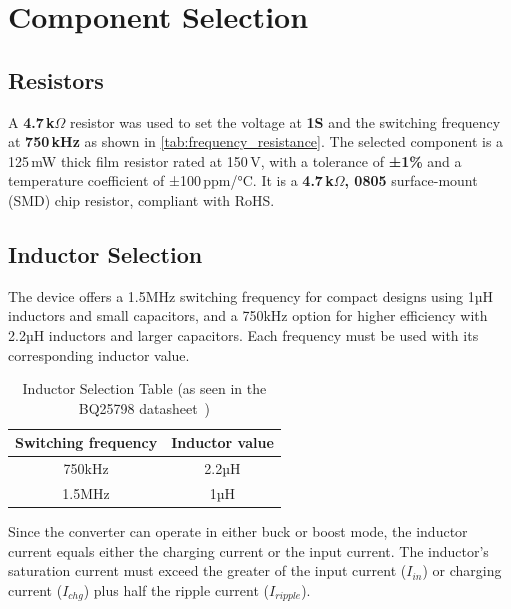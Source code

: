\documentclass[12pt]{article}
\begin{document}
\section{Component Selection}

\subsection{Resistors}
A \textbf{4.7\,k\(\Omega\)} resistor was used to set the voltage at \textbf{ 1S} and the switching frequency at \textbf{ 750\,kHz} as shown in \autoref{tab:frequency_resistance}.
The selected component is a 125\,mW thick film resistor rated at 150\,V, with a tolerance of \textbf{±1\%} and a temperature coefficient of ±100\,ppm/°C. It is a \textbf{4.7\,k\(\Omega\), 0805} surface-mount (SMD) chip resistor, compliant with RoHS.

\subsection{Inductor Selection}
The device offers a 1.5MHz switching frequency for compact designs using 1µH inductors and small capacitors, and a 750kHz option for higher efficiency with 2.2µH inductors and larger capacitors. Each frequency must be used with its corresponding inductor value. 

\begin{table}[H]
    \centering
    \begin{tabular}{|c|c|}
        \hline
        \rowcolor{headerbg}
        \textcolor{headerfg}{\textbf{Switching frequency}} &
        \textcolor{headerfg}{\textbf{Inductor value}} \\
        \hline
        750kHz & 2.2µH \\
        1.5MHz & 1µH \\
        \hline
    \end{tabular}
    \caption{Inductor Selection Table (as seen in the BQ25798 datasheet~\cite[p.~46]{TI_BQ25798})}
    \label{tab:Inductor-Selection}
\end{table}

Since the converter can operate in either buck or boost mode, the inductor current equals either the charging current or the input current. The inductor's saturation current must exceed the greater of the input current ($I_{in}$) or charging current ($I_{chg}$) plus half the ripple current ($I_{ripple}$).
\end{document}
